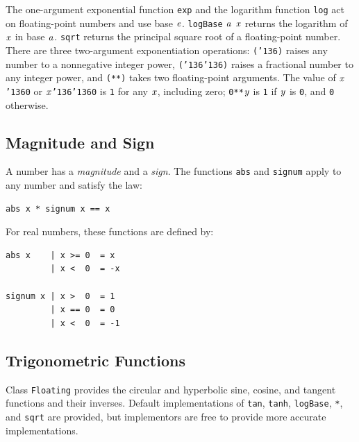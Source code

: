 The one-argument exponential function \mbox{\tt exp} and the
logarithm function \mbox{\tt log} act on floating-point numbers and
use base \mbox{$\it e$}.  \mbox{\tt logBase} \mbox{$\it a$} \mbox{$\it x$} returns the
logarithm of \mbox{$\it x$} in base \mbox{$\it a$}.  \mbox{\tt sqrt} returns the
principal square root of a floating-point number.
There are three two-argument exponentiation operations:
\mbox{\tt ({\char'136})} raises any  %
number to a nonnegative integer power,
\mbox{\tt ({\char'136}{\char'136})} raises a
fractional number to any integer power, and \mbox{\tt (**)}
\indextt{**}
takes two floating-point arguments.  The value of \mbox{$\it x$}\mbox{\tt {\char'136}0} or \mbox{$\it x$}\mbox{\tt {\char'136}{\char'136}0}
is \mbox{\tt 1} for any \mbox{$\it x$}, including zero; \mbox{\tt 0**}\mbox{$\it y$} is \mbox{\tt 1} if \mbox{$\it y$} is \mbox{\tt 0}, and
\mbox{\tt 0} otherwise.
  
\subsection{Magnitude and Sign}
\label{magnitude-sign}

A number has a {\em magnitude}
and a {\em sign}.  The functions \mbox{\tt abs} and
\mbox{\tt signum} apply to any number and satisfy the law:
\bprog
{\small\begin{verbatim}
abs x * signum x == x
\end{verbatim}}
\eprog
For real numbers, these functions are defined by:
\bprog
{\small\begin{verbatim}
abs x    | x >= 0  = x
         | x <  0  = -x

signum x | x >  0  = 1
         | x == 0  = 0
         | x <  0  = -1
\end{verbatim}}
\eprog

\subsection{Trigonometric Functions}

Class \mbox{\tt Floating} provides the 
circular and hyperbolic sine, cosine,
and tangent functions and their inverses.
Default implementations of \mbox{\tt tan}, \mbox{\tt tanh}, \mbox{\tt logBase}, \mbox{\tt **}, and \mbox{\tt sqrt} are
provided, but implementors are free to provide more accurate implementations.

